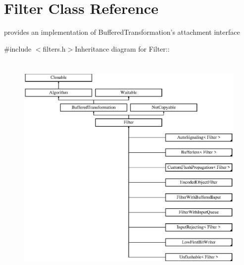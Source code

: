 \hypertarget{class_filter}{
\section{Filter Class Reference}
\label{class_filter}
}


provides an implementation of BufferedTransformation's attachment interface  


{\ttfamily \#include $<$filters.h$>$}Inheritance diagram for Filter::\begin{figure}[H]
\begin{center}
\leavevmode
\includegraphics[height=11.3928cm]{class_filter}
\end{center}
\end{figure}
